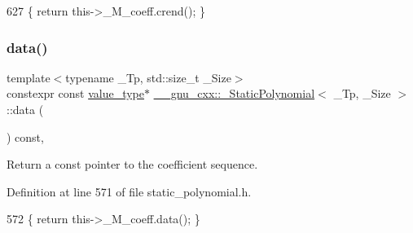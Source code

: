 \begin{DoxyCode}
627       \{ \textcolor{keywordflow}{return} this->\_M\_coeff.crend(); \}
\end{DoxyCode}
\mbox{\label{class____gnu__cxx_1_1__StaticPolynomial_a5dfe81eb78faeacfc8ea3fbe195139de}} 
\subsubsection{\texorpdfstring{data()}{data()}\hspace{0.1cm}{\footnotesize\ttfamily [1/2]}}
{\footnotesize\ttfamily template$<$typename \+\_\+\+Tp, std\+::size\+\_\+t \+\_\+\+Size$>$ \\
constexpr const \hyperlink{class____gnu__cxx_1_1__StaticPolynomial_aad5f3d6d5876b6926b30724aeac649d6}{value\+\_\+type}$\ast$ \hyperlink{class____gnu__cxx_1_1__StaticPolynomial}{\+\_\+\+\_\+gnu\+\_\+cxx\+::\+\_\+\+Static\+Polynomial}$<$ \+\_\+\+Tp, \+\_\+\+Size $>$\+::data (\begin{DoxyParamCaption}{ }\end{DoxyParamCaption}) const\hspace{0.3cm}{\ttfamily [inline]}, {\ttfamily [noexcept]}}

Return a {\ttfamily const} pointer to the coefficient sequence. 

Definition at line 571 of file static\+\_\+polynomial.\+h.


\begin{DoxyCode}
572       \{ \textcolor{keywordflow}{return} this->\_M\_coeff.data(); \}
\end{DoxyCode}
\mbox{\label{class____gnu__cxx_1_1__StaticPolynomial_afa52c120f0daf872a8ab0c5c2757781f}} 
